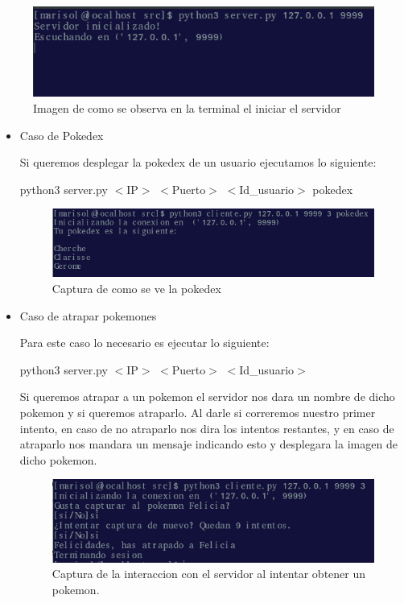 \documentclass[11pt,letterpaper]{article}
\begin{document}
\begin{figure}[h!]
	\centering
	\includegraphics[width=0.7\linewidth]{1}
	\caption{Imagen de como se observa en la terminal el iniciar el servidor}
	\label{fig:1}
\end{figure}


\begin{itemize}
	\item Caso de Pokedex 
	
	Si queremos desplegar la pokedex de un usuario ejecutamos lo siguiente:
	
	\textsf{python3 server.py $<$IP$>$ $<$Puerto$>$ $<$Id\_usuario$>$ pokedex}
	
	\begin{figure}[h!]
		\centering
		\includegraphics[width=0.7\linewidth]{pokedex}
		\caption{Captura de como se ve la pokedex}
		\label{fig:pokedex}
	\end{figure}
	
	
	\item Caso de atrapar pokemones
	
	Para este caso lo necesario es ejecutar lo siguiente: 
	
	\textsf{python3 server.py $<$IP$>$ $<$Puerto$>$ $<$Id\_usuario$>$}
	
	Si queremos atrapar a un pokemon el servidor nos dara un nombre de dicho pokemon y si queremos atraparlo. Al darle si correremos nuestro primer intento, en caso de no atraparlo nos dira los intentos restantes, y en caso de atraparlo nos mandara un mensaje indicando esto y desplegara la imagen de dicho pokemon.
	
	\begin{figure}
		\centering
		\includegraphics[width=0.7\linewidth]{Cachado1}
		\caption{Captura de la interaccion con el servidor al intentar obtener un pokemon.}
		\label{fig:cachado1}
	\end{figure}
	

\end{itemize}
\end{document}
